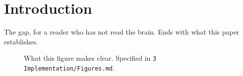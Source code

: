 \section{Introduction}
\label{sec:introduction}

The gap, for a reader who has not read the brain. Ends with what this paper establishes.

\begin{figure}[t]
  \centering
  \caption{What this figure makes clear. Specified in \texttt{3 Implementation/Figures.md}.}
  \label{fig:overview}
\end{figure}

